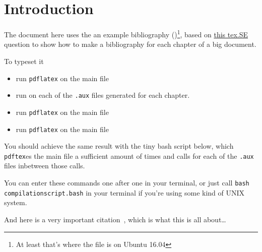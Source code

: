 \chapter{Introduction}
The document here uses the an example bibliography ()\footnote{At least that's where the file is on Ubuntu 16.04}, based on \href{https://tex.stackexchange.com/a/57599/828}{this tex.SE} question to show how to make a bibliography for each chapter of a big document.

To typeset it
\begin{itemize}
	\item run \verb+pdflatex+ on the main file
	\item run  on each of the \verb+.aux+ files generated for each chapter.
	\item run \verb+pdflatex+ on the main file
	\item run \verb+pdflatex+ on the main file
\end{itemize}

You should achieve the same result with the tiny bash script below, which \verb+pdftex+es the main file a sufficient amount of times and calls  for each of the \verb+.aux+ files inbetween those calls.



You can enter these commands one after one in your terminal, or just call \verb+bash compilationscript.bash+ in your terminal if you're using some kind of UNIX system.

And here is a very important citation~\cite{article-full}, which is what this is all about\ldots


